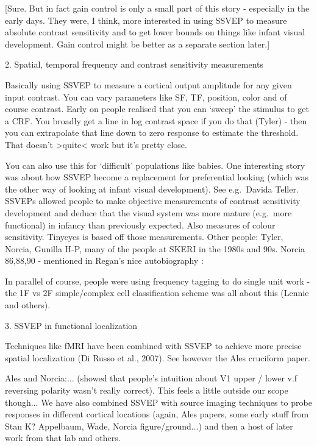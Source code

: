 \documentclass[
  letterpaper,
  DIV=11,
  numbers=noendperiod]{scrartcl}
\begin{document}
{[}Sure. But in fact gain control is only a small part of this story -
especially in the early days. They were, I think, more interested in
using SSVEP to measure absolute contrast sensitivity and to get lower
bounds on things like infant visual development. Gain control might be
better as a separate section later.{]}

\label{anchor-4}{}2. Spatial, temporal frequency and
contrast sensitivity measurements

Basically using SSVEP to measure a cortical output amplitude for any
given input contrast. You can vary parameters like SF, TF, position,
color and of course contrast. Early on people realised that you can
`sweep' the stimulus to get a CRF. You broadly get a line in log
contrast space if you do that (Tyler) - then you can extrapolate that
line down to zero response to estimate the threshold. That doesn't
\textgreater quite\textless{} work but it's pretty close.

You can also use this for `difficult' populations like babies. One
interesting story was about how SSVEP become a replacement for
preferential looking (which was the other way of looking at infant
visual development). See e.g.~Davida Teller. SSVEPs allowed people to
make objective measurements of contrast sensitivity development and
deduce that the visual system was more mature (e.g.~more functional) in
infancy than previously expected. Also measures of colour sensitivity.
Tinyeyes is based off those measurements. Other people: Tyler, Norcia,
Gunilla H-P, many of the people at SKERI in the 1980s and 90s. Norcia
86,88,90 - mentioned in Regan's nice autobiography :

In parallel of course, people were using frequency tagging to do single
unit work - the 1F vs 2F simple/complex cell classification scheme was
all about this (Lennie and others).

\label{anchor-5}{}3. SSVEP in functional localization

Techniques like fMRI have been combined with SSVEP to achieve more
precise spatial localization (Di Russo et al., 2007). See however the
Ales cruciform paper.

Ales and Norcia:... (showed that people's intuition about V1 upper /
lower v.f reversing polarity wasn't really correct). This feels a little
outside our scope though... We have also combined SSVEP with source
imaging techniques to probe responses in different cortical locations
(again, Ales papers, some early stuff from Stan K? Appelbaum, Wade,
Norcia figure/ground...) and then a host of later work from that lab and
others.
\end{document}
